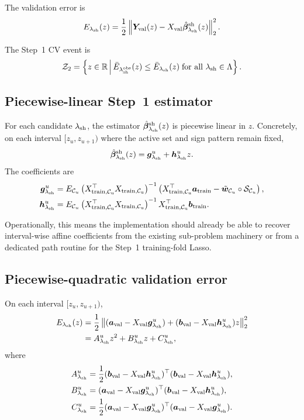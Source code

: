 \documentclass[11pt]{article}
\begin{document}
The validation error is
\[
E_{\lambda_{\rm sh}}(z)
=
\frac{1}{2}
\left\| \bm{Y}_{\rm val}(z) - X_{\rm val}\hat{\bm\beta}^{\rm sh}_{\lambda_{\rm sh}}(z) \right\|_2^2.
\]

The Step~1 CV event is
\[
\mathcal{Z}_2
=
\left\{ z \in \mathbb{R} \, \middle| \,
\bar{E}_{\lambda_{\rm sh}^{\rm obs}}(z) \le \bar{E}_{\lambda_{\rm sh}}(z)
\;\text{for all } \lambda_{\rm sh} \in \Lambda
\right\}.
\]

\subsection{Piecewise-linear Step~1 estimator}
For each candidate $\lambda_{\rm sh}$, the estimator $\hat{\bm\beta}^{\rm sh}_{\lambda_{\rm sh}}(z)$ is piecewise linear in $z$. Concretely, on each interval $[z_u, z_{u+1})$ where the active set and sign pattern remain fixed,
\[
\hat{\bm\beta}^{\rm sh}_{\lambda_{\rm sh}}(z)
=
\bm{g}_{\lambda_{\rm sh}}^{u} + \bm{h}_{\lambda_{\rm sh}}^{u} z.
\]
The coefficients are
\begin{align*}
\bm{g}_{\lambda_{\rm sh}}^{u}
&=
E_{\mathcal{C}_u}
\left(X_{\rm train,\mathcal{C}_u}^{\top}X_{\rm train,\mathcal{C}_u}\right)^{-1}
\left(X_{\rm train,\mathcal{C}_u}^{\top}\bm{a}_{\rm train} - \tilde{\bm w}_{\mathcal{C}_u} \circ \mathcal{S}_{\mathcal{C}_u}\right),
\\
\bm{h}_{\lambda_{\rm sh}}^{u}
&=
E_{\mathcal{C}_u}
\left(X_{\rm train,\mathcal{C}_u}^{\top}X_{\rm train,\mathcal{C}_u}\right)^{-1}
X_{\rm train,\mathcal{C}_u}^{\top}\bm{b}_{\rm train}.
\end{align*}

Operationally, this means the implementation should already be able to recover interval-wise affine coefficients from the existing sub-problem machinery or from a dedicated path routine for the Step~1 training-fold Lasso.

\subsection{Piecewise-quadratic validation error}
On each interval $[z_u, z_{u+1})$,
\begin{align*}
E_{\lambda_{\rm sh}}(z)
&=
\frac{1}{2}
\left\|
(\bm{a}_{\rm val} - X_{\rm val}\bm{g}_{\lambda_{\rm sh}}^{u})
+
(\bm{b}_{\rm val} - X_{\rm val}\bm{h}_{\lambda_{\rm sh}}^{u}) z
\right\|_2^2
\\
&=
A_{\lambda_{\rm sh}}^{u} z^2 + B_{\lambda_{\rm sh}}^{u} z + C_{\lambda_{\rm sh}}^{u},
\end{align*}
where
\begin{align*}
A_{\lambda_{\rm sh}}^{u}
&=
\frac{1}{2}
(\bm{b}_{\rm val} - X_{\rm val}\bm{h}_{\lambda_{\rm sh}}^{u})^{\top}
(\bm{b}_{\rm val} - X_{\rm val}\bm{h}_{\lambda_{\rm sh}}^{u}),
\\
B_{\lambda_{\rm sh}}^{u}
&=
(\bm{a}_{\rm val} - X_{\rm val}\bm{g}_{\lambda_{\rm sh}}^{u})^{\top}
(\bm{b}_{\rm val} - X_{\rm val}\bm{h}_{\lambda_{\rm sh}}^{u}),
\\
C_{\lambda_{\rm sh}}^{u}
&=
\frac{1}{2}
(\bm{a}_{\rm val} - X_{\rm val}\bm{g}_{\lambda_{\rm sh}}^{u})^{\top}
(\bm{a}_{\rm val} - X_{\rm val}\bm{g}_{\lambda_{\rm sh}}^{u}).
\end{align*}
\end{document}
